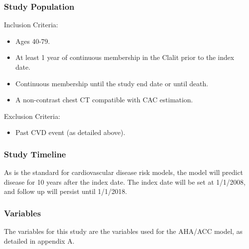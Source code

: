 \documentclass[a4paper,12pt]{article}
\begin{document}
		\subsubsection*{Study Population}
		Inclusion Criteria:
		\begin{itemize}
			\item Ages 40-79.
			\item At least 1 year of continuous membership in the Clalit prior to the index date.
			\item Continuous membership until the study end date or until death.
			\item A non-contrast chest CT compatible with CAC estimation.
		\end{itemize}
		
		Exclusion Criteria:
		\begin{itemize}
			\item Past CVD event (as detailed above).
		\end{itemize}
		
		\subsubsection*{Study Timeline}
		As is the standard for cardiovascular disease risk models, the model will predict disease for 10 years after the index date. The index date will be set at 1/1/2008, and follow up will persist until 1/1/2018.
		
		\subsubsection*{Variables}
		The variables for this study are the variables used for the AHA/ACC model, as detailed in appendix A.
		
\end{document}
